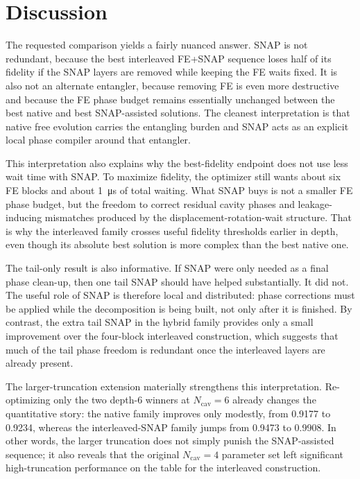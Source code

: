 \documentclass[aps,pra,twocolumn,reprint,amsmath,amssymb]{revtex4-2}
\begin{document}
\section{Discussion}
The requested comparison yields a fairly nuanced answer. SNAP is not redundant,
because the best interleaved FE+SNAP sequence loses half of its fidelity if the
SNAP layers are removed while keeping the FE waits fixed. It is also not an
alternate entangler, because removing FE is even more destructive and because
the FE phase budget remains essentially unchanged between the best native and
best SNAP-assisted solutions. The cleanest interpretation is that native free
evolution carries the entangling burden and SNAP acts as an explicit local phase
compiler around that entangler.

This interpretation also explains why the best-fidelity endpoint does not use
less wait time with SNAP. To maximize fidelity, the optimizer still wants about
six FE blocks and about \SI{1}{\micro\second} of total waiting. What SNAP buys
is not a smaller FE phase budget, but the freedom to correct residual cavity
phases and leakage-inducing mismatches produced by the displacement-rotation-wait
structure. That is why the interleaved family crosses useful fidelity thresholds
earlier in depth, even though its absolute best solution is more complex than
the best native one.

The tail-only result is also informative. If SNAP were only needed as a final
phase clean-up, then one tail SNAP should have helped substantially. It did not.
The useful role of SNAP is therefore local and distributed: phase corrections
must be applied while the decomposition is being built, not only after it is
finished. By contrast, the extra tail SNAP in the hybrid family provides only a
small improvement over the four-block interleaved construction, which suggests
that much of the tail phase freedom is redundant once the interleaved layers are
already present.

The larger-truncation extension materially strengthens this interpretation.
Re-optimizing only the two depth-6 winners at $N_{\mathrm{cav}}=6$ already
changes the quantitative story: the native family improves only modestly, from
0.9177 to 0.9234, whereas the interleaved-SNAP family jumps from 0.9473 to
0.9908. In other words, the larger truncation does not simply punish the
SNAP-assisted sequence; it also reveals that the original $N_{\mathrm{cav}}=4$
parameter set left significant high-truncation performance on the table for the
interleaved construction.
\end{document}
